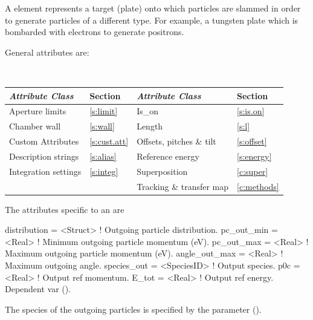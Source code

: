 A  element represents a target (plate) onto which particles are slammed in order to generate
particles of a different type. For example, a tungsten plate which is bombarded with electrons to
generate positrons.

General  attributes are:
\begin{center}
\tt
\begin{tabular}{llll} \toprule
  {\sl Attribute Class}      & Section           & {\sl Attribute Class}      & Section         \\ \midrule
  Aperture limits            & \ref{s:limit}     & Is_on                      & \ref{s:is.on}   \\
  Chamber wall               & \ref{s:wall}      & Length                     & \ref{s:l}       \\
  Custom Attributes          & \ref{s:cust.att}  & Offsets, pitches \& tilt   & \ref{s:offset}  \\
  Description strings        & \ref{s:alias}     & Reference energy           & \ref{s:energy}  \\ 
  Integration settings       & \ref{s:integ}     & Superposition              & \ref{c:super}   \\
                             &                   & Tracking \& transfer map   & \ref{c:methods} \\ 
  \bottomrule
\end{tabular}
\end{center}

The attributes specific to an  are 
\begin{example}
  distribution    = <Struct>    ! Outgoing particle distribution.
  pc_out_min      = <Real>      ! Minimum outgoing particle momentum (eV).
  pc_out_max      = <Real>      ! Maximum outgoing particle momentum (eV).
  angle_out_max   = <Real>      ! Maximum outgoing angle.
  species_out     = <SpeciesID> ! Output species.
  p0c             = <Real>      ! Output ref momentum.
  E_tot           = <Real>      ! Output ref energy. Dependent var ().
\end{example}

The species of the outgoing particles is specified by the  parameter
().

